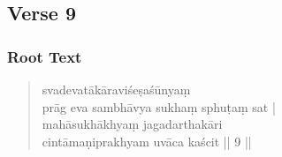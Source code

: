 \documentclass[12pt]{article}
\begin{document}
% 

\subsection{Verse 9}
\subsubsection{Root Text}
\begin{quote}
	svadevatākāraviśeṣaśūnyaṃ \\
	prāg eva sambhāvya sukhaṃ sphuṭaṃ sat |\\
	mahāsukhākhyaṃ jagadarthakāri \\
	cintāmaṇiprakhyam uvāca kaścit || 9 ||

% 
\end{quote}
\end{document}
